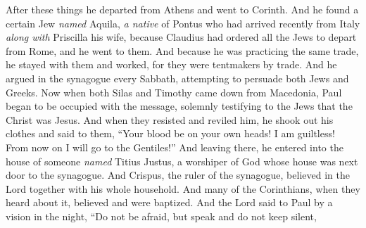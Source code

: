 \begin{biblechapter} %
 After these things he departed from Athens and went to Corinth.
\verse And he found a certain Jew \textit{named} Aquila, \textit{a native} of Pontus who had arrived recently from Italy \textit{along with} Priscilla his wife, because Claudius had ordered all the Jews to depart from Rome, and he went to them.
\verse And because he was practicing the same trade, he stayed with them and worked, for they were tentmakers by trade.
\verse And he argued in the synagogue every Sabbath, attempting to persuade both Jews and Greeks.
\verse Now when both Silas and Timothy came down from Macedonia, Paul began to be occupied with the message, solemnly testifying to the Jews that the Christ was Jesus.
\verse And when they resisted and reviled him, he shook out his clothes and said to them, “Your blood be on your own heads! I am guiltless! From now on I will go to the Gentiles!”
\verse And leaving there, he entered into the house of someone \textit{named} Titius Justus, a worshiper of God whose house was next door to the synagogue.
\verse And Crispus, the ruler of the synagogue, believed in the Lord together with his whole household. And many of the Corinthians, when they heard about it, believed and were baptized.
\verse And the Lord said to Paul by a vision in the night, “Do not be afraid, but speak and do not keep silent,

\end{biblechapter}
